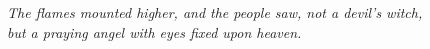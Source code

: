 \documentclass[b6paper]{scrbook}
\begin{document}
\begin{figure}[htbp]
\linethickness{2pt}
	\centering%
	\caption{\textit{The flames mounted higher, and the people saw, not a devil’s witch, but a praying angel with eyes fixed upon heaven.}}
\end{figure}



\backmatter


\end{document}
